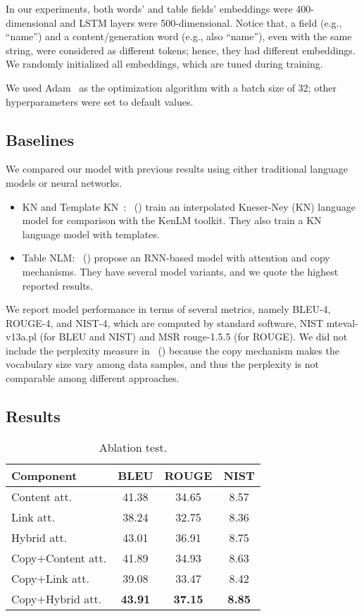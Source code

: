 \documentclass[letterpaper]{article} %
\newcommand{\newcite}[1]{\citeauthor{#1}~(\citeyear{#1})}
\begin{document}
In our experiments, both words' and table fields' embeddings were 400-dimensional and LSTM layers were 500-dimensional. Notice that, a field (e.g., ``name'') and a content/generation word (e.g., also ``name''), even with the same string, were considered as different tokens; hence, they had different embeddings. We randomly initialized all embeddings, which are tuned during training.

We used Adam~\cite{adam} as the optimization algorithm with a batch size of 32; other hyperparameters were set to default values.





\subsection{Baselines}
We compared our model with previous results using either traditional language models or neural networks.
\begin{itemize}
	\item KN and Template KN~\cite{heafield2013scalable}: \newcite{wikibio} train an interpolated Kneser-Ney (KN) language model for comparison with the KenLM toolkit. They also train a KN language model with templates.
	
	\item Table NLM: \newcite{wikibio} propose an RNN-based model with attention and copy mechanisms. They have several model variants, and we quote the highest reported results.
\end{itemize}

We report model performance in terms of several metrics, namely BLEU-4, ROUGE-4, and NIST-4, which are computed by standard software, NIST mteval-v13a.pl (for BLEU and NIST) and MSR rouge-1.5.5 (for ROUGE). We did not include the perplexity measure in \newcite{wikibio} because the copy mechanism makes the vocabulary size vary among data samples, and thus the perplexity is not comparable among different approaches.


\subsection{Results}

\begin{table}[!t]
	\centering
	\begin{tabular}{lccc}
		\toprule
		\!\!\textbf{Component} & \textbf{BLEU} & \textbf{ROUGE} & \textbf{NIST}\\
		\midrule
		\!\!Content att. &41.38 &34.65 & 8.57\\
		\!\!Link att.   &38.24 &32.75 &8.36 \\
		\!\!Hybrid att. &43.01 &36.91 & 8.75\\
		\midrule
		\!\!Copy$+$Content att. &41.89 &34.93 & 8.63\\
		\!\!Copy$+$Link att.    &39.08 &33.47 &8.42 \\
		\!\!Copy$+$Hybrid att.  &\textbf{43.91} &\textbf{37.15} & \textbf{8.85}\\
		\bottomrule
	\end{tabular}
	\caption{Ablation test.}\label{tab:ablation}
\end{table}
\end{document}
